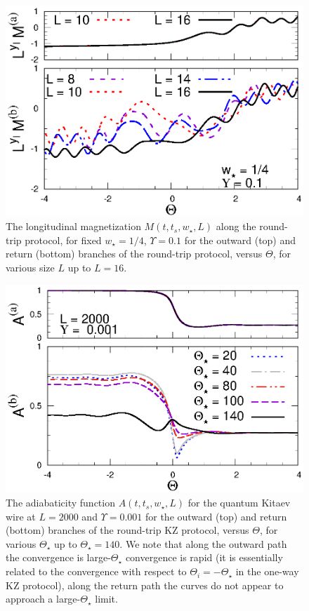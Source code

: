 \begin{figure}[!htb]
\centering
  \includegraphics[width=0.65\columnwidth]{imm/headIQMY01W025X.eps}
 \caption{ The longitudinal magnetization $M(t,t_s,w_\star,L)$ along
   the round-trip protocol, for fixed $w_\star = 1/4$, $\Upsilon =
   0.1$ for the outward (top) and return (bottom) branches of the
   round-trip protocol, versus $\Theta$, for various size $L$ up to
   $L=16$.  }
  \label{roundtripMxW}
\end{figure}







\begin{figure}[!htb]
\centering
  \includegraphics[width=0.65\columnwidth]{imm/headKITY0001L2000A.eps}
 \caption{The adiabaticity function $A(t,t_s,w_\star,L)$ for the
   quantum Kitaev wire at $L=2000$ and $\Upsilon = 0.001$ for the
   outward (top) and return (bottom) branches of the round-trip KZ
   protocol, versus $\Theta$, for various $\Theta_\star$ up to
   $\Theta_\star = 140$.  We note that along the outward path the
   convergence is large-$\Theta_\star$ convergence is rapid (it is
   essentially related to the convergence with respect to
   $\Theta_i=-\Theta_\star$ in the one-way KZ protocol), along the
   return path the curves do not appear to approach a
   large-$\Theta_\star$ limit.}
  \label{diffThetaStarA}
\end{figure}

